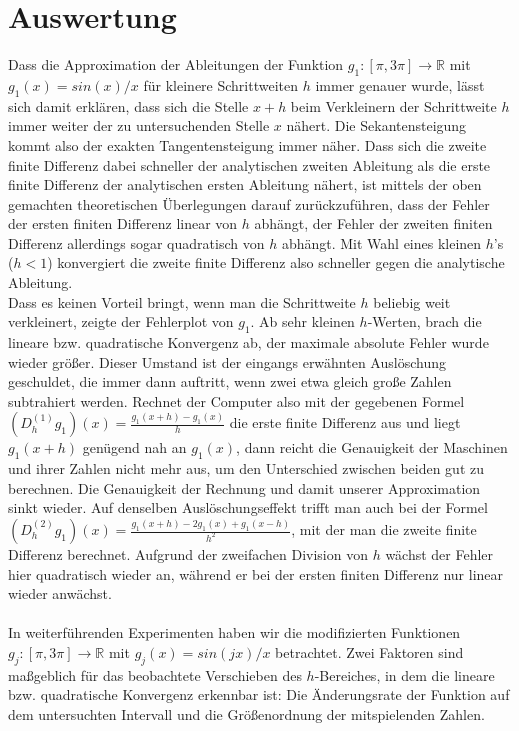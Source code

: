 \documentclass{scrartcl}
\begin{document}
\pagebreak \section{Auswertung}
\label{sec:auswertung}
Dass die Approximation der Ableitungen der Funktion $g_1:[\pi, 3\pi] \rightarrow \mathbb{R}$ mit $g_1(x)=sin(x)/x$ für kleinere Schrittweiten $h$ immer genauer wurde, lässt sich damit erklären, dass sich die Stelle $x+h$ beim Verkleinern der Schrittweite $h$ immer weiter der zu untersuchenden Stelle $x$ nähert.
Die Sekantensteigung kommt also der exakten Tangentensteigung immer näher.
Dass sich die zweite finite Differenz dabei schneller der analytischen zweiten Ableitung als die erste finite Differenz der analytischen ersten Ableitung nähert, ist mittels der oben gemachten theoretischen Überlegungen darauf zurückzuführen, dass der Fehler der ersten finiten Differenz linear von $h$ abhängt, der Fehler der zweiten finiten Differenz allerdings sogar quadratisch von $h$ abhängt.
Mit Wahl eines kleinen $h$'s ($h<1$) konvergiert die zweite finite Differenz also schneller gegen die analytische Ableitung. \\
Dass es keinen Vorteil bringt, wenn man die Schrittweite $h$ beliebig weit verkleinert, zeigte der Fehlerplot von $g_1$. Ab sehr kleinen $h$-Werten, brach die lineare bzw. quadratische Konvergenz ab, der maximale absolute Fehler wurde wieder größer.
Dieser Umstand ist der eingangs erwähnten Auslöschung geschuldet, die immer dann auftritt, wenn zwei etwa gleich große Zahlen subtrahiert werden.
Rechnet der Computer also mit der gegebenen Formel $(D_h^{(1)}g_1)(x) = \frac{g_1(x+h)-g_1(x)}{h}$ die erste finite Differenz aus und liegt $g_1(x+h)$ genügend nah an $g_1(x)$, dann reicht die Genauigkeit der Maschinen und ihrer Zahlen nicht mehr aus, um den Unterschied zwischen beiden gut zu berechnen. Die Genauigkeit der Rechnung und damit unserer Approximation sinkt wieder.
Auf denselben Auslöschungseffekt trifft man auch bei der Formel $(D_h^{(2)}g_1)(x) = \frac{g_1(x+h)-2g_1(x)+g_1(x-h)}{h^2}$, mit der man die zweite finite Differenz berechnet.
Aufgrund der zweifachen Division von $h$ wächst der Fehler hier quadratisch wieder an, während er bei der ersten finiten Differenz nur linear wieder anwächst. \\
 \\
In weiterführenden Experimenten haben wir die modifizierten Funktionen $g_j:[\pi, 3\pi] \rightarrow \mathbb{R}$ mit $g_j(x) = sin(j x)/x$ betrachtet. Zwei Faktoren sind maßgeblich für das beobachtete Verschieben des $h$-Bereiches, in dem die lineare bzw. quadratische Konvergenz erkennbar ist: Die Änderungsrate der Funktion auf dem untersuchten Intervall und die Größenordnung der mitspielenden Zahlen. \\
\end{document}

